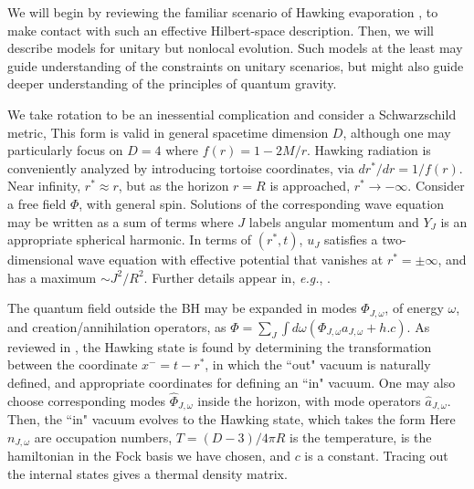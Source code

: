 We will begin by reviewing the familiar scenario of Hawking evaporation \Hawkrad, to make contact with such an effective Hilbert-space description.  Then, we will describe models for unitary but nonlocal evolution.  Such models at the least may guide understanding of the constraints on unitary scenarios, but might also guide deeper understanding of the principles of quantum gravity.



We take rotation to be an inessential complication and consider a Schwarzschild metric,
%
\eqn{}
%
This form is valid in general spacetime dimension $D$, although one may particularly focus on $D=4$ where $f(r)= 1-2M/r$.  Hawking radiation is conveniently analyzed by introducing tortoise coordinates, via $dr^*/dr = 1/f(r)$.  Near infinity, $r^*\approx r$, but as the horizon $r=R$  is approached, $r^*\rightarrow -\infty$.  Consider a free field $\Phi$, with general spin.  Solutions of the corresponding wave equation may be written as a sum of terms
%
\eqn{}
%
where $J$ labels angular momentum and $Y_J$ is an appropriate spherical harmonic.  In terms of $(r^*,t)$, $u_J$ satisfies a two-dimensional wave equation with  effective potential that vanishes at $r^*=\pm\infty$, and has a maximum $\sim J^2/R^2$.  Further details appear in, {\it e.g.},  .

The quantum field outside the BH may be expanded in modes $\Phi_{J,\omega}$, of energy $\omega$, and creation/annihilation operators, as $\Phi=\sum_J\int d\omega (\Phi_{J,\omega} a_{J,\omega}+h.c)$.  As reviewed in \SGTrieste, the Hawking state is found by determining the transformation between the coordinate $x^-=t-r^*$, in which the ``out" vacuum is naturally defined, and appropriate coordinates for defining an ``in" vacuum.  One may also choose corresponding modes  ${\hat \Phi}_{J,\omega}$ inside the horizon, with mode operators ${\hat a}_{J,\omega}$.  Then, the ``in" vacuum evolves to the Hawking state, which takes the form
%
\eqn{}
%
Here $n_{J,\omega}$ are occupation numbers, $T=(D-3)/4\pi R$ is the temperature,
%
\eqn{}
%
is the hamiltonian in the Fock basis we have chosen, and  $c$ is a constant.  Tracing out the internal states gives a thermal density matrix.

